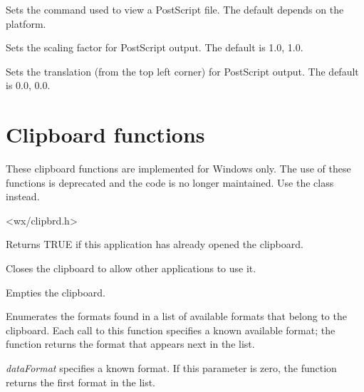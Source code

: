 Sets the command used to view a PostScript file. The default depends on the platform.



Sets the scaling factor for PostScript output. The default is 1.0, 1.0.



Sets the translation (from the top left corner) for PostScript output. The default is 0.0, 0.0.

\section{Clipboard functions}\label{clipsboard}

These clipboard functions are implemented for Windows only. The use of these functions
is deprecated and the code is no longer maintained. Use the 
class instead.


<wx/clipbrd.h>



Returns TRUE if this application has already opened the clipboard.



Closes the clipboard to allow other applications to use it.



Empties the clipboard.



Enumerates the formats found in a list of available formats that belong
to the clipboard. Each call to this  function specifies a known
available format; the function returns the format that appears next in
the list.

{\it dataFormat} specifies a known format. If this parameter is zero,
the function returns the first format in the list.


